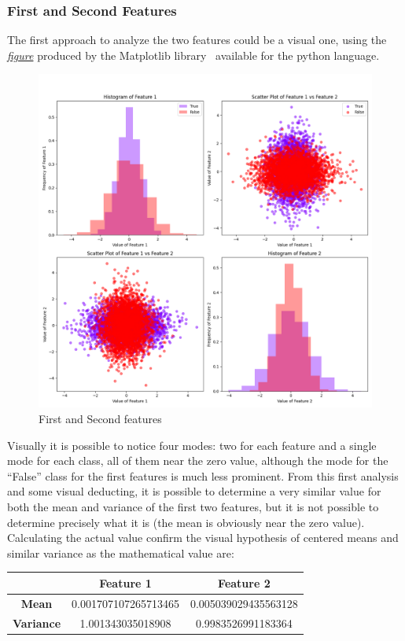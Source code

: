 \documentclass[a4paper, 12pt, english]{article}
\begin{document}
    \subsubsection{First and Second Features}\label{project1:1}
    The first approach to analyze the two features could be a visual one, using the \hyperref[fig:project1_1-2]{\textit{figure}} produced by the Matplotlib library~\cite{Hunter:2007} available for the python language.
    \begin{figure}[H]
        \centering
        \includegraphics[width=0.7\linewidth]{img/projects/project1/1-2.png}
        \caption{First and Second features}\label{fig:project1_1-2}
    \end{figure}

    Visually it is possible to notice four modes: two for each feature and a single mode for each class, all of them near the zero value, although the mode for the ``False'' class for the first features is much less prominent. From this first analysis and some visual deducting, it is possible to determine a very similar value for both the mean and variance of the first two features, but it is not possible to determine precisely what it is (the mean is obviously near the zero value).
    Calculating the actual value confirm the visual hypothesis of centered means and similar variance as the mathematical value are:
    \begin{table}[htbp]
        \centering
        \begin{tabular}{|c|c|c|}
            \hline
            & \textbf{Feature 1}   & \textbf{Feature 2}   \\
            \hline
            \textbf{Mean}     & 0.001707107265713465 & 0.005039029435563128 \\
            \hline
            \textbf{Variance} & 1.001343035018908    & 0.9983526991183364   \\
            \hline
        \end{tabular}
    \end{table}
\end{document}
